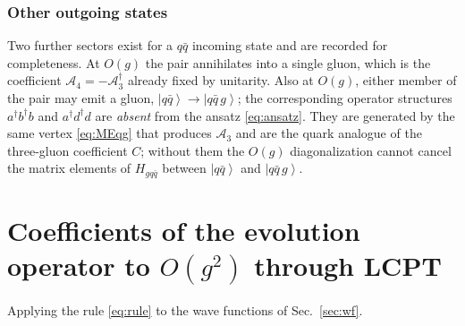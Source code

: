 \documentclass[11pt]{article}
\newcommand{\dg}{\dagger}
\newcommand{\ket}[1]{\left|#1\right\rangle}
\newcommand{\A}{\mathcal{A}}
\begin{document}
\subsubsection{Other outgoing states}

Two further sectors exist for a $q\bar q$ incoming state and are recorded for completeness.
At $O(g)$ the pair annihilates into a single gluon, which is the coefficient
$\A_{4}=-\A_{3}^{\dg}$ already fixed by unitarity. Also at $O(g)$, either member of the pair may
emit a gluon, $\ket{q\bar q}\to\ket{q\bar q\,g}$; the corresponding operator structures
$a^{\dg}b^{\dg}b$ and $a^{\dg}d^{\dg}d$ are \emph{absent} from the ansatz \eqref{eq:ansatz}.
They are generated by the same vertex \eqref{eq:MEqg} that produces $\A_{3}$ and are the quark
analogue of the three-gluon coefficient $C$; without them the $O(g)$ diagonalization cannot
cancel the matrix elements of $H_{gq\bar q}$ between $\ket{q\bar q}$ and $\ket{q\bar q\,g}$.

\section{Coefficients of the evolution operator to $O(g^{2})$ through LCPT}
\label{sec:coeff}

Applying the rule \eqref{eq:rule} to the wave functions of Sec.~\ref{sec:wf}.
\end{document}
